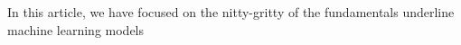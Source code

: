 In this article, we have focused on the nitty-gritty of the fundamentals underline machine learning models 